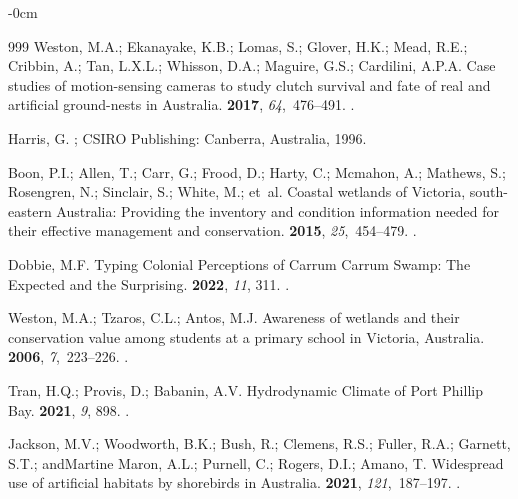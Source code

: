 \documentclass[jmse,article,accept,pdftex,oneauthor]{Definitions/mdpi}
\begin{document}
\begin{adjustwidth}{-\extralength}{0cm}
\begin{thebibliography}{999}
Weston, M.A.; Ekanayake, K.B.; Lomas, S.; Glover, H.K.; Mead, R.E.; Cribbin,
  A.; Tan, L.X.L.; Whisson, D.A.; Maguire, G.S.; Cardilini, A.P.A.
\newblock Case studies of motion-sensing cameras to study clutch survival and
  fate of real and artificial ground-nests in Australia.
 {\bf 2017}, {\em 64},~476--491.
.

Harris, G.
; CSIRO Publishing: Canberra, Australia,  1996.

Boon, P.I.; Allen, T.; Carr, G.; Frood, D.; Harty, C.; Mcmahon, A.; Mathews,
  S.; Rosengren, N.; Sinclair, S.; White, M.;  et~al.
\newblock Coastal wetlands of Victoria, south-eastern Australia: Providing the
  inventory and condition information needed for their effective management and
  conservation.
 {\bf
  2015}, {\em 25},~454--479.
.

Dobbie, M.F.
\newblock Typing Colonial Perceptions of Carrum Carrum Swamp: The Expected and
  the Surprising.
 {\bf 2022}, {\em 11}, 311.
.

Weston, M.A.; Tzaros, C.L.; Antos, M.J.
\newblock Awareness of wetlands and their conservation value among students at
  a primary school in Victoria, Australia.
 {\bf 2006}, {\em
  7},~223--226.
.

Tran, H.Q.; Provis, D.; Babanin, A.V.
\newblock Hydrodynamic Climate of Port Phillip Bay.
 {\bf 2021}, {\em 9}, 898.
.

Jackson, M.V.; Woodworth, B.K.; Bush, R.; Clemens, R.S.; Fuller, R.A.; Garnett,
  S.T.; andMartine Maron, A.L.; Purnell, C.; Rogers, D.I.; Amano, T.
\newblock Widespread use of artificial habitats by shorebirds in Australia.
 {\bf 2021}, {\em 121},~187--197.
.


\end{thebibliography}
\end{adjustwidth}
\end{document}
